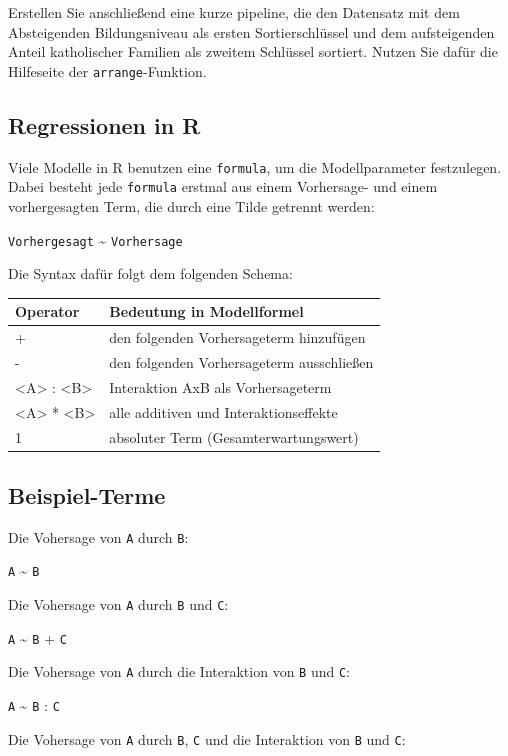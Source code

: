 \documentclass[
]{book}
\begin{document}
Erstellen Sie anschließend eine kurze pipeline, die den Datensatz mit dem Absteigenden Bildungsniveau als ersten Sortierschlüssel und dem aufsteigenden Anteil katholischer Familien als zweitem Schlüssel sortiert. Nutzen Sie dafür die Hilfeseite der \texttt{arrange}-Funktion.

\hypertarget{regressionen-in-r}{%
\subsection{Regressionen in R}\label{regressionen-in-r}}

Viele Modelle in R benutzen eine \texttt{formula}, um die Modellparameter festzulegen.
Dabei besteht jede \texttt{formula} erstmal aus einem Vorhersage- und einem vorhergesagten Term, die durch eine Tilde getrennt werden:

\texttt{Vorhergesagt} \textasciitilde{} \texttt{Vorhersage}

Die Syntax dafür folgt dem folgenden Schema:

\begin{longtable}[]{@{}ll@{}}
\toprule
Operator & Bedeutung in Modellformel\tabularnewline
\midrule
\endhead
+ & den folgenden Vorhersageterm hinzufügen\tabularnewline
- & den folgenden Vorhersageterm ausschließen\tabularnewline
\textless A\textgreater{} : \textless B\textgreater{} & Interaktion AxB als Vorhersageterm\tabularnewline
\textless A\textgreater{} * \textless B\textgreater{} & alle additiven und Interaktionseffekte\tabularnewline
1 & absoluter Term (Gesamterwartungswert)\tabularnewline
\bottomrule
\end{longtable}

\hypertarget{beispiel-terme}{%
\subsection{Beispiel-Terme}\label{beispiel-terme}}

Die Vohersage von \texttt{A} durch \texttt{B}:

\texttt{A} \textasciitilde{} \texttt{B}

Die Vohersage von \texttt{A} durch \texttt{B} und \texttt{C}:

\texttt{A} \textasciitilde{} \texttt{B} + \texttt{C}

Die Vohersage von \texttt{A} durch die Interaktion von \texttt{B} und \texttt{C}:

\texttt{A} \textasciitilde{} \texttt{B} : \texttt{C}

Die Vohersage von \texttt{A} durch \texttt{B}, \texttt{C} und die Interaktion von \texttt{B} und \texttt{C}:
\end{document}
